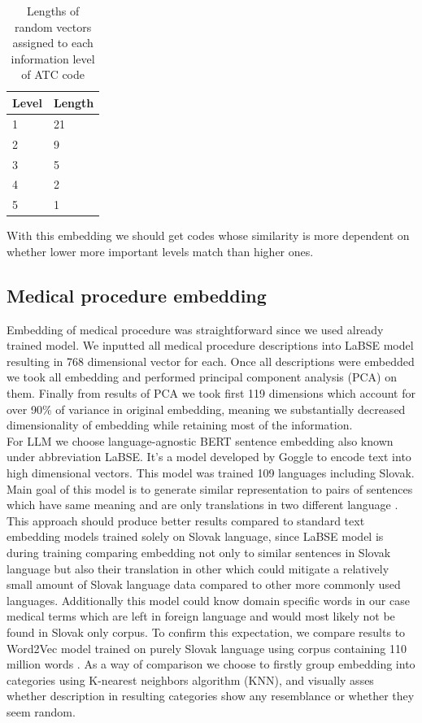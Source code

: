 \begin{table}[!h]
	\centering
	\begin{tabular}{|l|l|}
		\hline
		Level  & Length \\ \hline
		1 & 21 \\ \hline
		2 & 9 \\ \hline
		3 & 5 \\ \hline
		4 & 2 \\ \hline
		5 & 1 \\ \hline
	\end{tabular}
	\caption{Lengths of random vectors assigned to each information level of ATC code}
	\label{tab:drug_lev_len}
\end{table}  

With this embedding we should get codes whose similarity is more dependent on whether lower more important levels match than higher ones.

\subsection{Medical procedure embedding}

Embedding of medical procedure was straightforward since we used already trained model. We inputted all medical procedure descriptions into LaBSE model resulting in 768 dimensional vector for each. Once all descriptions were embedded we took all embedding and performed principal component analysis (PCA) on them. Finally from results of PCA we took first 119 dimensions which account for over 90\% of variance in original embedding, meaning we substantially decreased dimensionality of embedding while retaining most of the information.
\\

For LLM we choose language-agnostic BERT sentence embedding also known under abbreviation LaBSE. It's a model developed by Goggle to encode text into high dimensional vectors. This model was trained 109 languages including Slovak. Main goal of this model is to generate similar representation to pairs of sentences which have same meaning and are only translations in two different language \cite{labse_kaggle}. This approach should produce better results compared to standard text embedding models trained solely on Slovak language, since LaBSE model is during training comparing embedding not only to similar sentences in Slovak language but also their translation in other which could mitigate a relatively small amount of Slovak language data compared to other more commonly used languages. Additionally this model could know domain specific words in our case medical terms which are left in foreign language and would most likely not be found in Slovak only corpus. To confirm this expectation, we compare results to Word2Vec model trained on purely Slovak language using corpus containing 110 million words \cite{word2vec}. As a way of comparison we choose to  firstly group embedding into categories using K-nearest neighbors algorithm (KNN), and visually asses whether description in resulting categories show any resemblance or whether they seem random. 
\\


